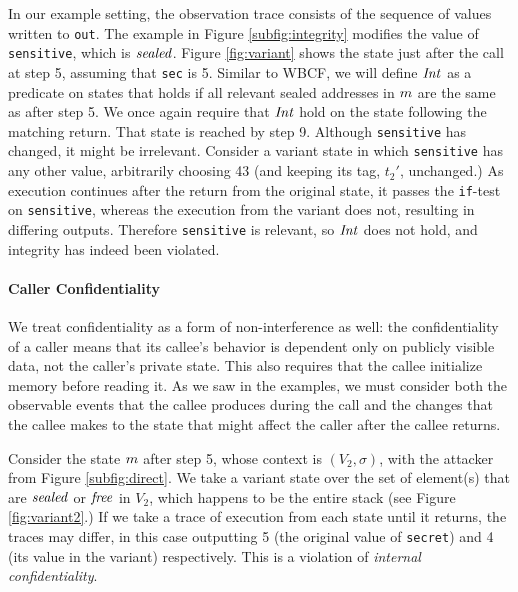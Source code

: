 \documentclass[10pt,conference]{ieeetran}%
\theoremstyle{definition}
\begin{document}
In our example setting, the observation trace consists of the sequence of values written to {\tt out}.
The example in Figure \ref{subfig:integrity} modifies the value of {\tt sensitive},
which is \(\mathit{sealed}\). Figure \ref{fig:variant} shows the state just after the call at step 5,
assuming that {\tt sec} is 5. Similar to WBCF, we will define
\(\mathit{Int}\) as a predicate on states that holds if
all relevant sealed addresses in \(m\) are the same as after step 5.
We once again require that \(\mathit{Int}\) hold on the state following the matching return.
That state is reached by step 9. Although {\tt sensitive} has changed, it might be
irrelevant. Consider a variant state in which {\tt sensitive} has any other value, arbitrarily
choosing 43 (and keeping its tag, \(t_2'\), unchanged.) As execution continues after the return
from the original state, it passes the {\tt if}-test on {\tt sensitive}, whereas the execution
from the variant does not, resulting in differing outputs. Therefore {\tt sensitive} is relevant,
so \(\mathit{Int}\) does not hold, and integrity has indeed been violated.

\paragraph*{Caller Confidentiality}

We treat confidentiality as a form of non-interference as well: the confidentiality of a caller
means that its callee's behavior is dependent only on publicly visible data,
not the caller's private state. This also requires that the callee initialize
memory before reading it.
As we saw in the examples, we must consider both the observable events
that the callee produces during the call and the changes that the callee makes to the state that might
affect the caller after the callee returns.

Consider the state \(m\) after step 5, whose context is \((V_2,\sigma)\), with the attacker from
Figure \ref{subfig:direct}. We take a variant state over the set of element(s) that are
\(\mathit{sealed}\) or \(\mathit{free}\) in \(V_2\), which happens to be the entire stack (see
Figure \ref{fig:variant2}.) If we take a trace of execution from each state until it returns,
the traces may differ, in this case outputting 5 (the original value of {\tt secret}) and
4 (its value in the variant) respectively. This is a violation of
{\it internal confidentiality}.
\end{document}
